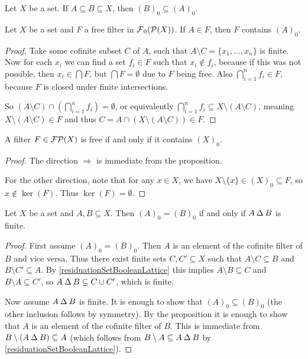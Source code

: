 \begin{lemma} \label{cofiniteFilterInclusion}
Let $X$ be a set. If $A\subseteq B\subseteq X$, then $(B)_0 \subseteq (A)_0$.
\end{lemma}

\begin{proposition} \label{freeFilterContainsCofiniteFilters}
Let $X$ be a set and $F$ a free filter in $\operatorname{\mathcal{F}}_0(\operatorname{\mathcal{P}}(X))$. If $A\in F$, then $F$ contains $(A)_0$.
\end{proposition}
\begin{proof}
Take some cofinite subset $C$ of $A$, such that $A\setminus C = \{x_1, \ldots, x_n\}$ is finite. Now for each $x_i$ we can find a set $f_i\in F$ such that $x_i\notin f_i$, because if this was not possible, then $x_i \in \bigcap F$, but $\bigcap F = \emptyset$ due to $F$ being free. Also $\bigcap_{i=1}^n f_i \in F$, because $F$ is closed under finite intersections.

So $(A\setminus C)\cap (\bigcap_{i=1}^n f_i) = \emptyset$, or equivalently $\bigcap_{i=1}^n f_i \subseteq X\setminus (A\setminus C)$, meaning $X\setminus (A\setminus C) \in F$ and thus $C = A\cap (X\setminus (A\setminus C)) \in F$.
\end{proof}
\begin{corollary} \label{filterFreeIFFfinerThanCofinite}
A filter $F\in\operatorname{\mathcal{FP}}(X)$ is free \textup{if and only if} it contains $(X)_0$.
\end{corollary}
\begin{proof}
The direction $\Rightarrow$ is immediate from the proposition.

For the other direction, note that for any $x\in X$, we have $X\setminus\{x\} \in (X)_0 \subseteq F$, so $x\notin \ker(F)$. Thus $\ker(F) = \emptyset$.
\end{proof}
\begin{corollary} \label{cofiniteFiltersSameIffDifferenceFinite}
Let $X$ be a set and $A,B\subseteq X$. Then $(A)_0 = (B)_0$ \textup{if and only if} $A\mathbin{\Delta} B$ is finite.
\end{corollary}
\begin{proof}
First assume $(A)_0 = (B)_0$. Then $A$ is an element of the cofinite filter of $B$ and vice versa. Thus there exist finite sets $C, C'\subseteq X$ such that $A\setminus C \subseteq B$ and $B\setminus C' \subseteq A$.
By \ref{residuationSetBooleanLattice} this implies $A\setminus B \subseteq C$ and $B\setminus A \subseteq C'$, so $A\mathbin{\Delta} B \subseteq C\cup C'$, which is finite.

Now assume $A\mathbin{\Delta} B$ is finite. It is enough to show that $(A)_0\subseteq (B)_0$ (the other inclusion follows by symmetry). By the proposition it is enough to show that $A$ is an element of the cofinite filter of $B$. This is immediate from $B\setminus (A\mathbin{\Delta} B) \subseteq A$ (which follows from $B\setminus A\subseteq A\mathbin{\Delta} B$ by \ref{residuationSetBooleanLattice}).
\end{proof}

